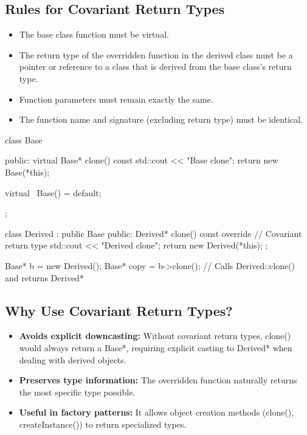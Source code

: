 \documentclass{report}
\begin{document}
\subsection{Rules for Covariant Return Types}
\bigbreak \noindent 
\begin{itemize}
    \item The base class function must be virtual.
    \item The return type of the overridden function in the derived class must be a pointer or reference to a class that is derived from the base class's return type.
    \item Function parameters must remain exactly the same.
    \item The function name and signature (excluding return type) must be identical.
\end{itemize}
\bigbreak \noindent 
\begin{cppcode}
    class Base {
        public:
        virtual Base* clone() const {
            std::cout << "Base clone\n";
            return new Base(*this);
        }

        virtual ~Base() = default;
    };

    class Derived : public Base {
        public:
        Derived* clone() const override {  // Covariant return type
            std::cout << "Derived clone\n";
            return new Derived(*this);
        }
    };
\end{cppcode}
Base* b = new Derived();
Base* copy = b->clone();  // Calls Derived::clone() and returns Derived*
\bigbreak \noindent 

\subsection{Why Use Covariant Return Types?}
\bigbreak \noindent 
\begin{itemize}
    \item \textbf{Avoids explicit downcasting:} Without covariant return types, clone() would always return a Base*, requiring explicit casting to Derived* when dealing with derived objects.
    \item \textbf{Preserves type information:} The overridden function naturally returns the most specific type possible.
    \item \textbf{Useful in factory patterns:} It allows object creation methods (clone(), createInstance()) to return specialized types.
\end{itemize}
\end{document}
